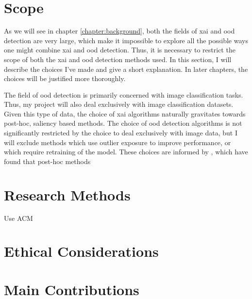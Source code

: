\documentclass[UKenglish]{uiomasterthesis} %
\theoremstyle{definition}
\begin{document}
\section{Scope} \label{section:scope}

As we will see in chapter \ref{chapter:background}, both the fields of \ac{xai} and \ac{ood} detection are very large, which make it impossible to explore all the possible ways one might combine \ac{xai} and \ac{ood} detection. Thus, it is necessary to restrict the scope of both the \ac{xai} and \ac{ood} detection methods used. In this section, I will describe the choices I've made and give a short explanation. In later chapters, the choices will be justified more thoroughly.

The field of \ac{ood} detection is primarily concerned with image classification tasks. Thus, my project will also deal exclusively with image classification datasets. Given this type of data, the choice of \ac{xai} algorithms naturally gravitates towards post-hoc, saliency based methods. The choice of \ac{ood} detection algorithms is not significantly restricted by the choice to deal exclusively with image data, but I will exclude methods which use outlier exposure to improve performance, or which require retraining of the model. These choices are informed by \cite{openood}, which have found that post-hoc methods


\section{Research Methods}

Use ACM

\section{Ethical Considerations}


\section{Main Contributions}
\end{document}
